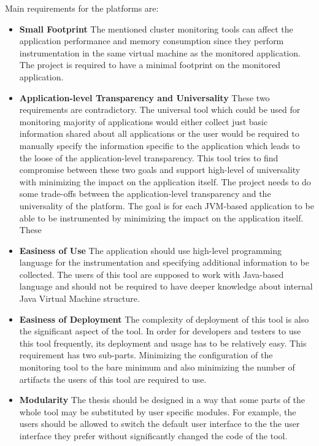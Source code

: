 Main requirements for the platforms are:
\begin{itemize}
	\item \textbf{Small Footprint} \newline
	 The mentioned cluster monitoring tools can affect the application performance and memory consumption since they perform instrumentation in the same virtual machine as the monitored application. The project is required to have a minimal footprint on the monitored application.
	\item \textbf{Application-level Transparency and Universality} \newline
	These two requirements are contradictory. The universal tool which could be used for monitoring majority of applications would either collect just basic information shared about all applications or the user would be required to manually specify the information specific to the application which leads to the loose of the application-level transparency. This tool tries to find compromise between these two goals and support high-level of universality with minimizing the impact on the application itself.
	The project needs to do some trade-offs between the application-level transparency and the universality of the platform. The goal is for each JVM-based application to be able to be instrumented by minimizing the impact on the application itself. These 
	\item \textbf{Easiness of Use} \newline
	The application should use high-level programming language for the instrumentation and specifying additional information to be collected. The users of this tool are supposed to work with Java-based language and should not be required to have deeper knowledge about internal Java Virtual Machine structure.
	\item \textbf{Easiness of Deployment} \newline
	The complexity of deployment of this tool is also the significant aspect of the tool. In order for developers and testers to use this tool frequently, its deployment and usage has to be relatively easy. This requirement has two sub-parts. Minimizing the configuration of the monitoring tool to the bare minimum and also minimizing the number of artifacts the users of this tool are required to use.
	\item \textbf{Modularity} \newline
	The thesis should be designed in a way that some parts of the whole tool may be substituted by user specific modules. For example, the users should be allowed to switch the default user interface to the the user interface they prefer without significantly changed the code of the tool.
\end{itemize}

